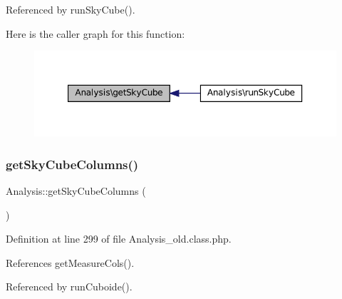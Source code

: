 Referenced by run\+Sky\+Cube().

Here is the caller graph for this function\+:\nopagebreak
\begin{figure}[H]
\begin{center}
\leavevmode
\includegraphics[width=350pt]{class_analysis_a19f2ae7fb1a840da628415f3f86a748a_icgraph}
\end{center}
\end{figure}
\mbox{\label{class_analysis_aa72f4d177d42a08267acf6442d9dd901}} 
\subsubsection{\texorpdfstring{get\+Sky\+Cube\+Columns()}{getSkyCubeColumns()}}
{\footnotesize\ttfamily Analysis\+::get\+Sky\+Cube\+Columns (\begin{DoxyParamCaption}{ }\end{DoxyParamCaption})}



Definition at line 299 of file Analysis\+\_\+old.\+class.\+php.



References get\+Measure\+Cols().



Referenced by run\+Cuboide().

